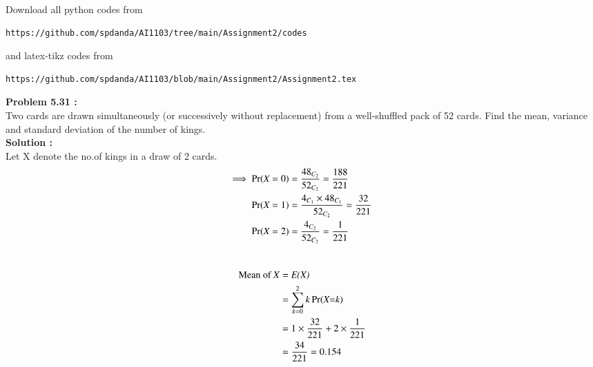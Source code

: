 \documentclass[journal,12pt,twocolumn]{IEEEtran}
\begin{document}
\maketitle
\newpage
\bigskip
\renewcommand{\thefigure}{\theenumi}
\renewcommand{\thetable}{\theenumi}
Download all python codes from 
\begin{lstlisting}
https://github.com/spdanda/AI1103/tree/main/Assignment2/codes
\end{lstlisting}
%
and latex-tikz codes from 
%
\begin{lstlisting}
https://github.com/spdanda/AI1103/blob/main/Assignment2/Assignment2.tex
\end{lstlisting}
\large\textbf{Problem 5.31 :}\\
Two cards are drawn simultaneously (or successively without replacement) from a well-shuffled  pack  of  52  cards.  Find  the  mean, variance and standard deviation of the number of kings.\\
\textbf{Solution :}\\
Let X denote the no.of kings in a draw of 2 cards.
\begin{align}
\Longrightarrow\; \Pr(\emph{X}=0) &= \dfrac{48_{C_2}}{52_{C_2}}=\dfrac{188}{221} \\
\Pr(\emph{X}=1) &= \dfrac{4_{C_1} \times48_{C_1}}{52_{C_2}}=\dfrac{32}{221} \\ 
\Pr(\emph{X}=2)&=\dfrac{4_{C_2}}{52_{C_2}}= \dfrac{1}{221}\\ \nonumber
\end{align}

\begin{center}
\begin{table}[h]
    \centering
    \caption{Probability distribution table }
    \label{table 1}
\end{table}
\end{center}

\newpage

\begin{align}
\nonumber\text{Mean of \emph{X}}&= \emph{E(X)} \\ \nonumber
               &=\sum_{\emph{k}=0}^{2} \nonumber k\Pr(\emph{X=k})\\\nonumber
               &=1 \times\frac{32}{221}+2 \times\frac{1}{221}\\
               &= \frac{34}{221} = 0.154\\\nonumber
\end{align}
\end{document}
